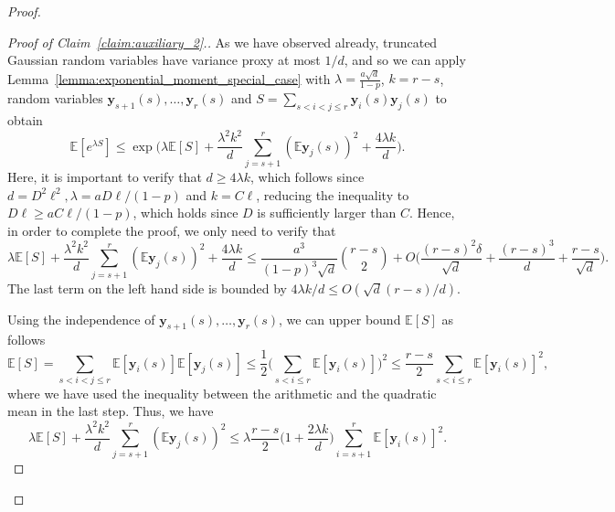 \documentclass[10pt,a4paper]{amsart}
\def\bE{\mathbb{E}}
\def\by{\boldsymbol{y}}
\begin{document}
\begin{proof}
\begin{proof}[Proof of Claim~\ref{claim:auxiliary_2}.]
As we have observed already, truncated Gaussian random variables have variance proxy at most $1/d$, and so we can apply Lemma~\ref{lemma:exponential_moment_special_case} with $\lambda=\frac{a\sqrt{d}}{1-p}$, $k=r-s$, random variables $\by_{s+1}(s), \dots, \by_{r}(s)$ and $S=\sum_{s<i<j\leq r}\by_i(s)\by_j(s)$ to obtain
{\smaller[0.3]
\[\bE[e^{\lambda S}]\leq \exp\bigg( \lambda \bE[S] \!+\! \frac{\lambda^2k^2}{d}\sum_{j=s+1}^r (\bE \by_j(s))^2 \!+\!\frac{4\lambda k}{d}\bigg).\]
}
Here, it is important to verify that $d\geq 4\lambda k$, which follows since $d=D^2\ell^2, \lambda=aD\ell/(1-p)$ and $k=C\ell$, reducing the inequality to $D\ell\geq aC\ell/(1-p)$, which holds since $D$ is sufficiently larger than $C$. Hence, in order to complete the proof, we only need to verify that
{\smaller[0.3]
\[\lambda \bE[S] \!+\! \frac{\lambda^2k^2}{d}\sum_{j=s+1}^r (\bE \by_j(s))^2 \!+\!\frac{4\lambda k}{d}\leq \frac{a^3}{(1\!-\!p)^3\sqrt{d}}\binom{r\!-\!s}{2}\!+\!O\Big(\frac{(r\!-\!s)^2\delta}{\sqrt{d}}\!+\!\frac{(r\!-\!s)^3}{d}\!+\!\frac{r-s}{\sqrt{d}}\Big).\]
}
The last term on the left hand side is bounded by $4\lambda k/d\leq O(\sqrt{d}(r-s)/d)$.

Using the independence of $\by_{s+1}(s), \dots, \by_r(s)$, we can upper bound $\bE[S]$ as follows
{\smaller[0.3]
\[\bE[S]=\sum_{s<i<j\leq r}\bE[\by_i(s)]\bE[\by_j(s)]\leq \frac{1}{2}\Big(\sum_{s<i\leq r}\bE[\by_i(s)]\Big)^2\leq \frac{r\!-\!s}{2}\sum_{s<i\leq r}\bE[\by_i(s)]^2,\]
}
where we have used the inequality between the arithmetic and the quadratic mean in the last step. Thus, we have
{\smaller[0.3]
\[\lambda \bE[S] \!+\! \frac{\lambda^2k^2}{d}\sum_{j=s+1}^r (\bE \by_j(s))^2\leq \lambda \frac{r\!-\!s}{2}\Big(1\!+\!\frac{2\lambda k}{d}\Big)\sum_{i=s+1}^r \bE[\by_i(s)]^2.\]
}


\end{proof}
\end{proof}
\end{document}
